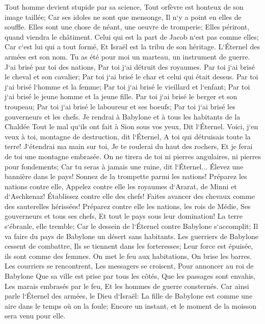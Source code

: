 \verse Tout homme devient stupide par sa science, Tout orfèvre est honteux de son image taillée; Car ses idoles ne sont que mensonge, Il n`y a point en elles de souffle. 
\verse Elles sont une chose de néant, une oeuvre de tromperie; Elles périront, quand viendra le châtiment. 
\verse Celui qui est la part de Jacob n`est pas comme elles; Car c`est lui qui a tout formé, Et Israël est la tribu de son héritage. L`Éternel des armées est son nom. 
\verse Tu as été pour moi un marteau, un instrument de guerre. J`ai brisé par toi des nations, Par toi j`ai détruit des royaumes. 
\verse Par toi j`ai brisé le cheval et son cavalier; Par toi j`ai brisé le char et celui qui était dessus. 
\verse Par toi j`ai brisé l`homme et la femme; Par toi j`ai brisé le vieillard et l`enfant; Par toi j`ai brisé le jeune homme et la jeune fille. 
\verse Par toi j`ai brisé le berger et son troupeau; Par toi j`ai brisé le laboureur et ses boeufs; Par toi j`ai brisé les gouverneurs et les chefs. 
\verse Je rendrai à Babylone et à tous les habitants de la Chaldée Tout le mal qu`ils ont fait à Sion sous vos yeux, Dit l`Éternel. 
\verse Voici, j`en veux à toi, montagne de destruction, dit l`Éternel, A toi qui détruisais toute la terre! J`étendrai ma main sur toi, Je te roulerai du haut des rochers, Et je ferai de toi une montagne embrasée. 
\verse On ne tirera de toi ni pierres angulaires, ni pierres pour fondements; Car tu seras à jamais une ruine, dit l`Éternel... 
\verse Élevez une bannière dans le pays! Sonnez de la trompette parmi les nations! Préparez les nations contre elle, Appelez contre elle les royaumes d`Ararat, de Minni et d`Aschkenaz! Établissez contre elle des chefs! Faites avancer des chevaux comme des sauterelles hérissées! 
\verse Préparez contre elle les nations, les rois de Médie, Ses gouverneurs et tous ses chefs, Et tout le pays sous leur domination! 
\verse La terre s`ébranle, elle tremble; Car le dessein de l`Éternel contre Babylone s`accomplit; Il va faire du pays de Babylone un désert sans habitants. 
\verse Les guerriers de Babylone cessent de combattre, Ils se tiennent dans les forteresses; Leur force est épuisée, ils sont comme des femmes. On met le feu aux habitations, On brise les barres. 
\verse Les courriers se rencontrent, Les messagers se croisent, Pour annoncer au roi de Babylone Que sa ville est prise par tous les côtés, 
\verse Que les passages sont envahis, Les marais embrasés par le feu, Et les hommes de guerre consternés. 
\verse Car ainsi parle l`Éternel des armées, le Dieu d`Israël: La fille de Babylone est comme une aire dans le temps où on la foule; Encore un instant, et le moment de la moisson sera venu pour elle. 
